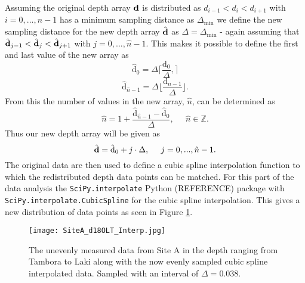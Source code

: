 \documentclass[../../CompleteThesis/Complete_1stDraft.tex]{subfiles}
\begin{document}
Assuming the original depth array $\text{\textbf{d}}$ is distributed as $d_{i-1} < d_i < d_{i+1}$ with $i = 0, ..., n-1$ has a minimum sampling distance as $\Delta_{\text{min}}$ we define the new sampling distance for the new depth array $\hat{\text{\textbf{d}}}$ as $\Delta =\Delta_{\text{min}}$ - again assuming that $\hat{\text{\textbf{d}}}_{j-1} < \hat{\text{\textbf{d}}}_j < \hat{\text{\textbf{d}}}_{j+1}$ with $j = 0, ..., \hat{n}-1$. This makes it possible to define the first and last value of the new array as
\begin{equation}
	\hat{\text{d}}_0 = \Delta \lceil \frac{\text{d}_0}{\Delta}, \rceil 
	\label{Eq:InterpDepthMin}
\end{equation}
\begin{equation}
	\hat{\text{d}}_{\hat{n}-1} = \Delta \lfloor \frac{\text{d}_{n-1}}{\Delta} \rfloor.
	\label{Eq:InterpDepthMax}
\end{equation}
From this the number of values in the new array, $\hat{n}$, can be determined as
\begin{equation}
	\hat{n} = 1 +  \frac{\hat{\text{d}}_{\hat{n}-1} - \hat{\text{d}}_0}{\Delta},\;\;\;\;\; \hat{n} \in\mathbb{Z}.
\end{equation}
Thus our new depth array will be given as
\begin{equation}
	\hat{\text{\textbf{d}}} = \hat{\text{d}}_0 + j\cdot\Delta,\;\;\;\;\; j = 0, ..., \hat{n}-1.
\end{equation}
The original data are then used to define a cubic spline interpolation function to which the redistributed depth data points can be matched. For this part of the data analysis the \lstinline[columns=fixed]|SciPy.interpolate| Python (REFERENCE) package with \lstinline[columns=fixed]|SciPy.interpolate.CubicSpline| for the cubic spline interpolation. This gives a new distribution of data points as seen in Figure \ref{fig:SiteA_d18OLT_Interp}.


\begin{figure}[h]
	\centering
	\texttt{[image: SiteA\_d18OLT\_Interp.jpg]}
	\caption[Measured and interpolated $\delta^{18}$O data, Site A]{The unevenly measured data from Site A in the depth ranging from Tambora to Laki along with the now evenly sampled cubic spline interpolated data. Sampled with an interval of $\Delta = 0.038$.}
	\label{fig:SiteA_d18OLT_Interp}
\end{figure}
\end{document}
